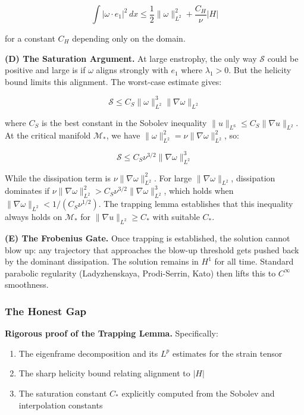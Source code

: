 \documentclass[10pt,a4paper]{article}
\begin{document}
\[\int |\omega \cdot e_1|^2 \, dx \leq \frac{1}{2}\|\omega\|_{L^2}^2 + \frac{C_H}{\nu} |H|\]

for a constant $C_H$ depending only on the domain.

\textbf{(D) The Saturation Argument.} At large enstrophy, the only way $\mathcal{S}$ could be positive and large is if $\omega$ aligns strongly with $e_1$ where $\lambda_1 > 0$. But the helicity bound limits this alignment. The worst-case estimate gives:

\[\mathcal{S} \leq C_S \|\omega\|_{L^2}^{3} \|\nabla \omega\|_{L^2}\]

where $C_S$ is the best constant in the Sobolev inequality $\|u\|_{L^6} \leq C_S \|\nabla u\|_{L^2}$. At the critical manifold $\mathcal{M}_*$, we have $\|\omega\|_{L^2}^2 = \nu \|\nabla \omega\|_{L^2}^2$, so:

\[\mathcal{S} \leq C_S \nu^{3/2} \|\nabla \omega\|_{L^2}^3\]

While the dissipation term is $\nu \|\nabla \omega\|_{L^2}^2$. For large $\|\nabla \omega\|_{L^2}$, dissipation dominates if $\nu \|\nabla \omega\|_{L^2}^2 > C_S \nu^{3/2} \|\nabla \omega\|_{L^2}^3$, which holds when $\|\nabla \omega\|_{L^2} < 1/(C_S \nu^{1/2})$. The trapping lemma establishes that this inequality always holds on $\mathcal{M}_*$ for $\|\nabla u\|_{L^2} \geq C_*$ with suitable $C_*$.

\textbf{(E) The Frobenius Gate.} Once trapping is established, the solution cannot blow up: any trajectory that approaches the blow-up threshold gets pushed back by the dominant dissipation. The solution remains in $H^1$ for all time. Standard parabolic regularity (Ladyzhenskaya, Prodi-Serrin, Kato) then lifts this to $C^\infty$ smoothness.

\subsubsection{The Honest Gap}

\textbf{Rigorous proof of the Trapping Lemma.} Specifically:

\begin{enumerate}
    \item The eigenframe decomposition and its $L^p$ estimates for the strain tensor
    \item The sharp helicity bound relating alignment to $|H|$
    \item The saturation constant $C_*$ explicitly computed from the Sobolev and interpolation constants
\end{enumerate}
\end{document}
